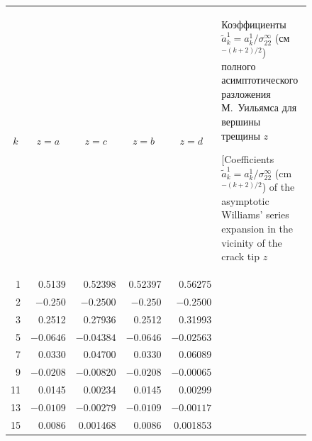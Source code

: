 \begin{figure}[p]

\small

\begin{tabular}{r|r|r|r|rp{4.6cm}}
\cline{1-5}
\multicolumn{1}{c|}{\footnotesize $k$} & 
\multicolumn{1}{c|}{\footnotesize  $z=a$} & 
\multicolumn{1}{c|}{\footnotesize  $z=c$} & 
\multicolumn{1}{c|}{\footnotesize  $z=b$} &
\multicolumn{1}{c}{\footnotesize   $z=d$} & 
\footnotesize   \vspace{-0.4cm}
Коэффициенты $\tilde a_k^1=a_k^1/\sigma_{22}^\infty$ (см$^{-(k+2)/2}$) полного асимптотического разложения М.~Уиль\-ямса для вершины трещины $z$ 
\par \smallskip 
[Coefficients $\tilde a_k^1=a_k^1/\sigma_{22}^\infty$ (cm$^{-(k+2)/2}$) of the asymp\-totic Williams' series expan\-sion in the vicinity of the crack tip $z$ 
\vspace{-4cm}
\\
\cline{1-5}
\rule{0mm}{12pt}%
1 & 0.5139\phantom{0}      & 0.52398\phantom{0}   & 0.52397\phantom{0}  & 0.56275\phantom{0} \\
2 &$-0.250$\phantom{00}  & $-0.2500$\phantom{00}& $-0.250$\phantom{00}& $-0.2500$\phantom{00} \\
3 & 0.2512\phantom{0}    & 0.27936\phantom{0}   & 0.2512\phantom{0}   & 0.31993\phantom{0} \\
5 & $-0.0646$\phantom{0} & $-0.04384$\phantom{0}& $-0.0646$\phantom{0}& $-0.02563$\phantom{0} \\
7 & 0.0330\phantom{0}    & 0.04700\phantom{0}   & 0.0330\phantom{0}   & 0.06089\phantom{0} \\
9 & $-0.0208$\phantom{0} & $-0.00820$\phantom{0}& $-0.0208$\phantom{0}& $-0.00065$\phantom{0} \\
11 & 0.0145\phantom{0}   & 0.00234\phantom{0}   & 0.0145\phantom{0}   & 0.00299\phantom{0}\\
13 & $-0.0109$\phantom{0}& $-0.00279$\phantom{0}& $-0.0109$\phantom{0}& $-0.00117$\phantom{0} \\
15 & 0.0086\phantom{0}   & 0.001468             & 0.0086\phantom{0}   & 0.001853\\

\end{tabular}
\end{figure}
